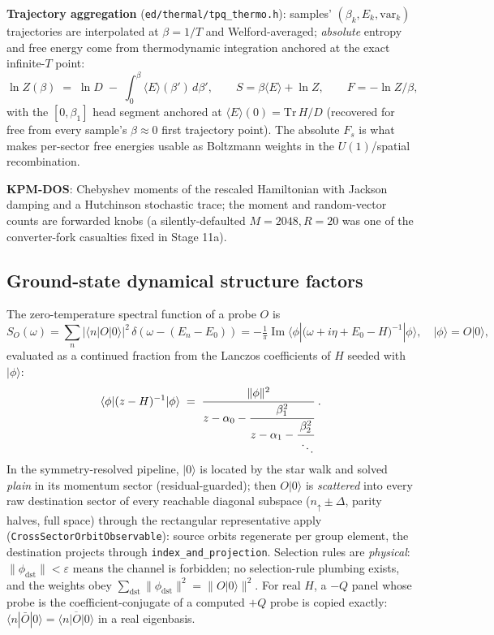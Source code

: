 \documentclass[11pt]{article}
\newcommand{\ket}[1]{|#1\rangle}
\newcommand{\bra}[1]{\langle#1|}
\newcommand{\file}[1]{\texttt{\small #1}}
\begin{document}
\textbf{Trajectory aggregation} (\file{ed/thermal/tpq\_thermo.h}): samples'
$(\beta_k, E_k, \mathrm{var}_k)$ trajectories are interpolated at
$\beta = 1/T$ and Welford-averaged; \emph{absolute} entropy and free energy
come from thermodynamic integration anchored at the exact infinite-$T$
point:
\begin{equation}
  \ln Z(\beta) \;=\; \ln D \;-\; \int_0^\beta \langle E \rangle(\beta')\,
  d\beta', \qquad
  S = \beta \langle E \rangle + \ln Z, \qquad F = -\ln Z / \beta,
  \label{eq:lnz}
\end{equation}
with the $[0, \beta_1]$ head segment anchored at
$\langle E\rangle(0) = \mathrm{Tr}\,H / D$ (recovered for free from every
sample's $\beta \approx 0$ first trajectory point). The absolute $F_s$ is
what makes per-sector free energies usable as Boltzmann weights in the
$U(1)$/spatial recombination.

\textbf{KPM-DOS}: Chebyshev moments of the rescaled Hamiltonian with
Jackson damping and a Hutchinson stochastic trace; the moment and
random-vector counts are forwarded knobs (a silently-defaulted $M{=}2048,
R{=}20$ was one of the converter-fork casualties fixed in Stage 11a).

\subsection{Ground-state dynamical structure factors}
\label{sec:dssf}

The zero-temperature spectral function of a probe $O$ is
\begin{equation}
  S_O(\omega) = \sum_n |\bra{n} O \ket{0}|^2\, \delta(\omega - (E_n - E_0))
  = -\tfrac{1}{\pi} \operatorname{Im}
    \bra{\phi} \bigl(\omega + i\eta + E_0 - H\bigr)^{-1} \ket{\phi},
  \quad \ket{\phi} = O\ket{0},
\end{equation}
evaluated as a continued fraction from the Lanczos coefficients of $H$
seeded with $\ket{\phi}$:
\begin{equation}
  \bra{\phi}(z - H)^{-1}\ket{\phi} \;=\;
  \cfrac{\lVert\phi\rVert^2}{z - \alpha_0 -
    \cfrac{\beta_1^2}{z - \alpha_1 - \cfrac{\beta_2^2}{\;\ddots}}}\ .
  \label{eq:cf}
\end{equation}
In the symmetry-resolved pipeline, $\ket{0}$ is located by the star walk
and solved \emph{plain} in its momentum sector (residual-guarded); then
$O\ket{0}$ is \emph{scattered} into every raw destination sector of every
reachable diagonal subspace ($n_\uparrow \pm \Delta$, parity halves, full
space) through the rectangular representative apply
(\texttt{CrossSectorOrbitObservable}): source orbits regenerate per group
element, the destination projects through
\texttt{index\_and\_projection}. Selection rules are \emph{physical}:
$\lVert \phi_{\mathrm{dst}} \rVert < \varepsilon$ means the channel is
forbidden; no selection-rule plumbing exists, and the weights obey
$\sum_{\mathrm{dst}} \lVert\phi_{\mathrm{dst}}\rVert^2 =
\lVert O\ket{0}\rVert^2$. For real $H$, a $-Q$ panel whose probe is the
coefficient-conjugate of a computed $+Q$ probe is copied exactly:
$\bra{n}\bar O\ket{0} = \overline{\bra{n} O \ket{0}}$ in a real eigenbasis.
\end{document}
